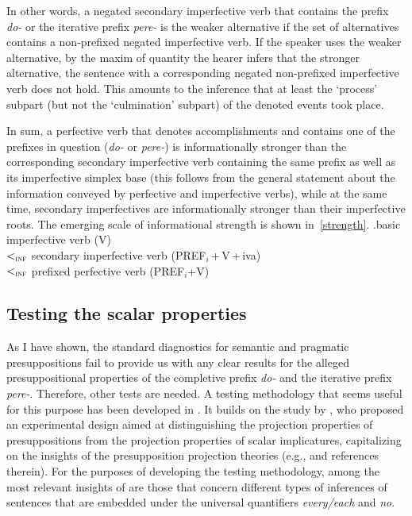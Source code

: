 In other words, a negated secondary imperfective verb that contains the prefix \textit{do-} or the iterative prefix \textit{pere-} is the weaker alternative if the set of alternatives contains a non-prefixed negated imperfective verb. If the speaker uses the weaker alternative, by the maxim of quantity \citep{Grice:75} the hearer infers that the stronger alternative, the sentence with a corresponding negated non-prefixed imperfective verb does not hold. This amounts to the inference that at least the `process' subpart (but not the `culmination' subpart) of the denoted events took place.

In sum, a perfective verb that denotes accomplishments and contains one of the prefixes in question (\textit{do-} or \textit{pere-}) is informationally stronger than the corresponding secondary imperfective verb containing the same prefix as well as its imperfective simplex base (this follows from the general statement about the information conveyed by perfective and imperfective verbs), while at the same time, secondary imperfectives are informationally stronger than their imperfective roots. The emerging scale of informational strength is shown in~\ref{strength}.
\ex.\label{strength}basic imperfective verb (V)\\
$<_{\textsc{inf}}$ secondary imperfective verb (PREF$_i$\,+\,V\,+\,iva)\\ $<_{\textsc{inf}}$ prefixed perfective verb (PREF$_i$+V)

\subsection{Testing the scalar properties}\label{sec:chemla}
As I have shown, the standard diagnostics for semantic and pragmatic presuppositions fail to provide us with any clear results for the alleged presuppositional properties of the completive prefix \textit{do-} and the iterative prefix \textit{pere-}. Therefore, other tests are needed. A testing methodology that seems useful for this purpose has been developed in \citealt{ZinovaFilip:SALT}. It builds on the study by \citet{Chemla:09}, who proposed an experimental design aimed at distinguishing the projection properties of presuppositions from the projection properties of scalar implicatures, capitalizing on the insights of the presupposition projection theories (e.g., \citealp{Heim:83, Schlenker:08} and references therein). For the purposes of developing the testing methodology, among the most relevant insights of \citet{Chemla:09} are those that concern different types of inferences of sentences that are embedded under the universal quantifiers \textit{every/each} and \textit{no}.

